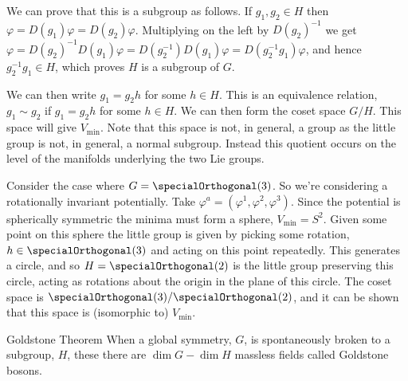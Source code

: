 \documentclass[fleqn]{NotesClass}
\begin{document}
    We can prove that this is a subgroup as follows.
    If \(g_1, g_2 \in H\) then \(\varphi = D(g_1) \varphi = D(g_2) \varphi\).
    Multiplying on the left by \(D(g_2)^{-1}\) we get \(\varphi = D(g_2)^{-1}D(g_1)\varphi = D(g_2^{-1})D(g_1) \varphi = D(g_2^{-1}g_1)\varphi\), and hence \(g_2^{-1}g_1 \in H\), which proves \(H\) is a subgroup of \(G\).
    
    We can then write \(g_1 = g_2 h\) for some \(h \in H\).
    This is an equivalence relation, \(g_1 \sim g_2\) if \(g_1 = g_2 h\) for some \(h \in H\).
    We can then form the coset space \(G/H\).
    This space will give \(V_{\min}\).
    Note that this space is not, in general, a group as the little group is not, in general, a normal subgroup.
    Instead this quotient occurs on the level of the manifolds underlying the two Lie groups.
    
    \begin{exm}{}{}
        Consider the case where \(G = \specialOrthogonal(3)\).
        So we're considering a rotationally invariant potentially.
        Take \(\varphi^a = (\varphi^1, \varphi^2, \varphi^3)\).
        Since the potential is spherically symmetric the minima must form a sphere, \(V_{\min} = S^2\).
        Given some point on this sphere the little group is given by picking some rotation, \(h \in \specialOrthogonal(3)\) and acting on this point repeatedly.
        This generates a circle, and so \(H = \specialOrthogonal(2)\) is the little group preserving this circle, acting as rotations about the origin in the plane of this circle.
        The coset space is \(\specialOrthogonal(3) / \specialOrthogonal(2)\), and it can be shown that this space is (isomorphic to) \(V_{\min}\).
    \end{exm}
    
    \begin{thm}{Goldstone Theorem}{}
        When a global symmetry, \(G\), is spontaneously broken to a subgroup, \(H\), these there are \(\dim G - \dim H\) massless fields called Goldstone bosons.
    \end{thm}
    
\end{document}
